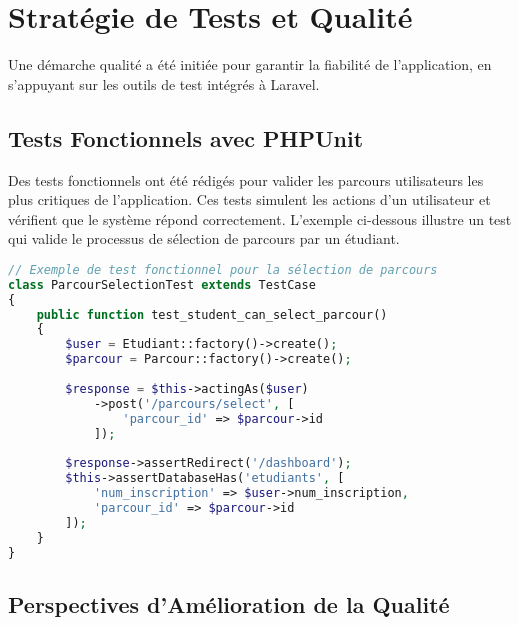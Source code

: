 \documentclass[12pt,a4paper]{report}
\begin{document}

\chapter{Stratégie de Tests et Qualité}

Une démarche qualité a été initiée pour garantir la fiabilité de l'application, en s'appuyant sur les outils de test intégrés à Laravel.

\section{Tests Fonctionnels avec PHPUnit}

Des tests fonctionnels ont été rédigés pour valider les parcours utilisateurs les plus critiques de l'application. Ces tests simulent les actions d'un utilisateur et vérifient que le système répond correctement. L'exemple ci-dessous illustre un test qui valide le processus de sélection de parcours par un étudiant.

\begin{lstlisting}[language=PHP]
// Exemple de test fonctionnel pour la sélection de parcours
class ParcourSelectionTest extends TestCase
{
    public function test_student_can_select_parcour()
    {
        $user = Etudiant::factory()->create();
        $parcour = Parcour::factory()->create();
        
        $response = $this->actingAs($user)
            ->post('/parcours/select', [
                'parcour_id' => $parcour->id
            ]);
            
        $response->assertRedirect('/dashboard');
        $this->assertDatabaseHas('etudiants', [
            'num_inscription' => $user->num_inscription,
            'parcour_id' => $parcour->id
        ]);
    }
}
\end{lstlisting}

\section{Perspectives d'Amélioration de la Qualité}
\end{document}
